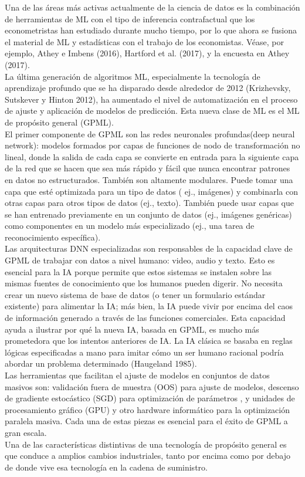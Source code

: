 Una de las áreas más activas actualmente de la ciencia de datos es la combinación de herramientas de ML con el tipo de inferencia contrafactual que los econometristas han estudiado durante mucho tiempo, por lo que ahora se fusiona el material de ML y estadísticas con el trabajo de los economistas. Véase, por ejemplo, Athey e Imbens (2016), Hartford et al. (2017), y la encuesta en Athey (2017).\\
La última generación de algoritmos ML, especialmente la tecnología de aprendizaje profundo que se ha disparado desde alrededor de 2012 (Krizhevsky, Sutskever y Hinton 2012), ha aumentado el nivel de automatización en el proceso de ajuste y aplicación de modelos de predicción. Esta nueva clase de ML es el ML de propósito general (GPML).\\
El primer componente de GPML son las redes neuronales profundas(deep neural network): modelos formados por capas de funciones de nodo de transformación no lineal, donde la salida de cada capa se convierte en entrada para la siguiente capa de la red que se hacen que sea más rápido y fácil que nunca encontrar patrones en datos no estructurados. También son altamente modulares. Puede tomar una capa que esté optimizada para un tipo de datos ( ej., imágenes) y combinarla con otras capas para otros tipos de datos (ej., texto). También puede usar capas que se han entrenado previamente en un conjunto de datos (ej., imágenes genéricas) como componentes en un modelo más especializado (ej., una tarea de reconocimiento específica).\\
Las arquitecturas DNN especializadas son responsables de la capacidad clave de GPML de trabajar con datos a nivel humano: video, audio y texto. Esto es esencial para la IA porque permite que estos sistemas se instalen sobre las mismas fuentes de conocimiento que los humanos pueden digerir. No necesita crear un nuevo sistema de base de datos (o tener un formulario estándar existente) para alimentar la IA; más bien, la IA puede vivir por encima del caos de información generado a través de las funciones comerciales. Esta capacidad ayuda a ilustrar por qué la nueva IA, basada en GPML, es mucho más prometedora que los intentos anteriores de IA. La IA clásica se basaba en reglas lógicas especificadas a mano para imitar cómo un ser humano racional podría abordar un problema determinado (Haugeland 1985).\\
Las herramientas que facilitan el ajuste de modelos en conjuntos de datos masivos son: validación fuera de muestra (OOS) para ajuste de modelos, descenso de gradiente estocástico (SGD) para optimización de parámetros , y unidades de procesamiento gráfico (GPU) y otro hardware informático para la optimización paralela masiva. Cada una de estas piezas es esencial para el éxito de GPML a gran escala.\\
Una de las características distintivas de una tecnología de propósito general es que conduce a amplios cambios industriales, tanto por encima como por debajo de donde vive esa tecnología en la cadena de suministro.

